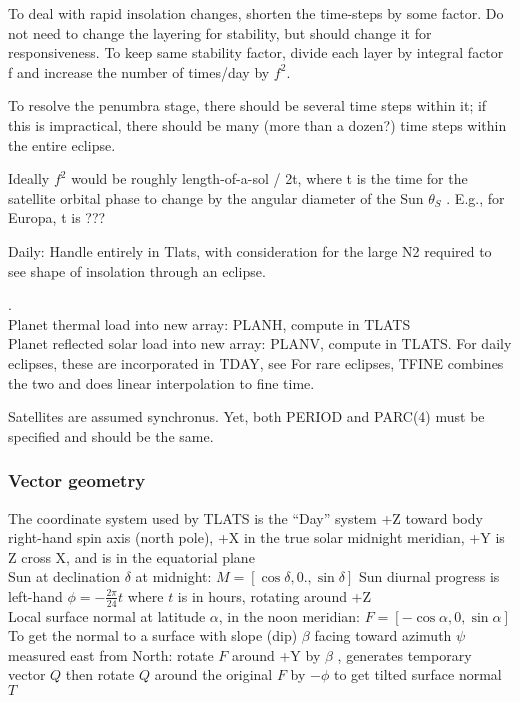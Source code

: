 \documentclass{article}
\begin{document}
 To deal with rapid insolation changes, shorten the time-steps by some
 factor. Do not need to change the layering for stability, but should change it
 for responsiveness. To keep same stability factor, divide each layer by
 integral factor f and increase the number of times/day by $f^2$.

To resolve the penumbra stage, there should be several time steps within it; if
this is impractical, there should be many (more than a dozen?) time steps within
the entire eclipse.

 Ideally $f^2$ would be roughly length-of-a-sol / 2t, where t is the time for
 the satellite orbital phase to change by the angular diameter of the Sun
 $\theta_S$ . E.g., for Europa, t is ???

Daily: Handle entirely in Tlats, with consideration for the large N2 required to
see shape of insolation through an eclipse.

.
\\ Planet thermal load into new array: PLANH, compute in TLATS 
\\ Planet reflected solar load into new array: PLANV, compute in TLATS.
\qi For daily eclipses, these are incorporated in TDAY, see 
\qi For rare eclipses, TFINE combines the two and does linear interpolation to fine time.


Satellites are assumed synchronus. Yet, both PERIOD and PARC(4) must be
specified and should be the same.

\subsubsection{Vector geometry}
 The coordinate system used by TLATS is the ``Day'' system
\qi +Z toward body right-hand spin axis (north pole),
\qi +X in the true solar midnight meridian,
\qi +Y is Z cross X, and is in the equatorial plane
\\ Sun at declination $\delta$ at midnight: $M=[ \cos \delta, 0., \sin \delta]$
\qi Sun diurnal progress is left-hand   $\phi=- \frac{2 \pi}{24} t$ where $t$ is in hours, rotating around +Z
\\ Local surface normal at latitude $\alpha$, in the noon meridian: $F =[ -\cos \alpha, 0, \sin \alpha]$
\\ To get the normal to a surface with slope (dip) $\beta$ facing toward azimuth $\psi$ measured east from North:
 \qi rotate $F$ around +Y by $\beta$ , generates temporary vector $Q$
\qi  then rotate $Q$ around the original $F$ by $-\phi$ to get tilted surface normal  $T$
\end{document}
